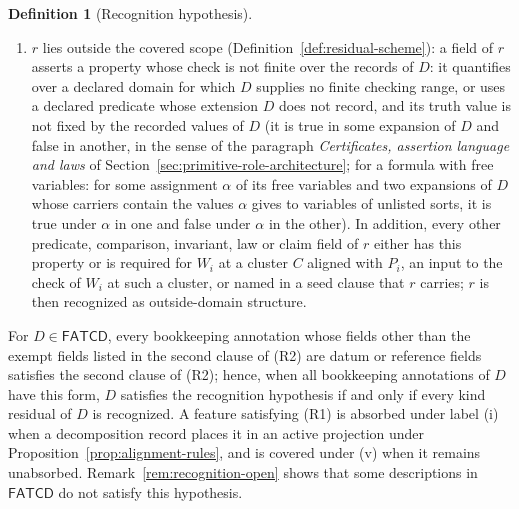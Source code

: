 \documentclass[11pt]{article}
\theoremstyle{definition}
\newtheorem{definition}[theorem]{Definition}
\newcommand{\FATCD}{\ensuremath{\mathsf{FATCD}}}
\newcommand{\Audit}[1]{\ensuremath{\operatorname{Audit}\!\left(#1\right)}}
\begin{document}
\begin{definition}[Recognition hypothesis]
\begin{enumerate}[label=(R\arabic*),topsep=2pt,itemsep=1pt]
    as in the running example of Section~\ref{sec:fatcd-domain}). A checked level translation from \(r_j\) to \(r_{j+1}\) is a
    comparison field of \(r_j\) referencing a translation annotation carried
    in \(\Audit{D}\) whose source and target contexts are levels recorded by level annotations whose target fields list \(r_j\) and \(r_{j+1}\), respectively, together with a finite
    bijection \(\beta\) of specified datum fields as above and a correct certificate, recorded true,
    that is such a conjunction of equalities,
    that each value equals its \(\beta\)-image;
  \item \(r\) lies outside the covered scope
    (Definition~\ref{def:residual-scheme}): a field of \(r\) asserts a property whose check is not finite over the records of \(D\): it quantifies over a declared domain for which \(D\) supplies no finite checking range, or uses a declared predicate whose extension \(D\) does not record, and its truth value is not fixed by the recorded values of \(D\) (it is true in some expansion of \(D\) and false in another, in the sense of the paragraph \emph{Certificates, assertion language and laws} of Section~\ref{sec:primitive-role-architecture}; for a formula with free variables: for some assignment \(\alpha\) of its free variables and two expansions of \(D\) whose carriers contain the values \(\alpha\) gives to variables of unlisted sorts, it is true under \(\alpha\) in one and false under \(\alpha\) in the other). In addition, every other predicate, comparison, invariant, law or claim field of \(r\) either has this property or is required for \(W_i\) at a cluster \(C\) aligned with \(P_i\), an input to the check of \(W_i\) at such a cluster, or named in a seed clause that \(r\) carries; \(r\) is then
    recognized as outside-domain structure.
\end{enumerate}
For \(D\in\FATCD{}\), every bookkeeping annotation whose fields other than the
exempt fields listed in the second clause of (R2) are datum or reference fields
satisfies the
second clause of (R2); hence, when all bookkeeping annotations of \(D\) have this
form, \(D\) satisfies the recognition hypothesis if and only if every
kind residual of \(D\) is recognized.
A feature satisfying (R1) is absorbed under label (i) when a decomposition record
places it in an active projection under
Proposition~\ref{prop:alignment-rules}, and is covered under (v) when it
remains unabsorbed. Remark~\ref{rem:recognition-open} shows that some
descriptions in \FATCD{} do not satisfy this hypothesis.
\end{definition}
\end{document}
